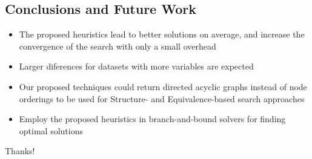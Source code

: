 \subsection{Conclusions and Future Work}
	\begin{frame}
		\begin{itemize}
			\item The proposed heuristics lead to better solutions on average, and increase the convergence of the search with only a small overhead
			\item Larger diferences for datasets with more variables are expected
			\item Our proposed techniques could return directed acyclic graphs instead of node orderings to be used for Structure- and Equivalence-based search approaches
			\item Employ the proposed heuristics in branch-and-bound solvers for finding optimal solutions
		\end{itemize}
	\end{frame}

\begin{frame}
	\centering
	\LARGE{Thanks!}
\end{frame}